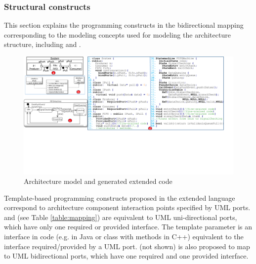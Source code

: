 \subsubsection{Structural constructs}
This section explains the programming constructs in the bidirectional mapping corresponding to the modeling concepts used for modeling the architecture structure, including  and .


\begin{figure}
	\centering
	\includegraphics[clip, trim=0cm 7cm 1.0cm 0cm, width=\textwidth]{figures/approachexample.pdf}
	\caption{Architecture model and generated extended code} 
	\label{fig:approachexample}
\end{figure}

\noindent
{}
Template-based programming constructs proposed in the extended language correspond to architecture component interaction points specified by UML ports.
 and  (see Table \ref{table:mapping}) are equivalent to UML uni-directional ports, which have only one required or provided interface.
The  template parameter is an interface in code (e.g.  in Java or class with  methods in C++) equivalent to the interface required/provided by a UML port. 
 (not shown) is also proposed to map to UML bidirectional ports, which have one required  and one provided  interface.

